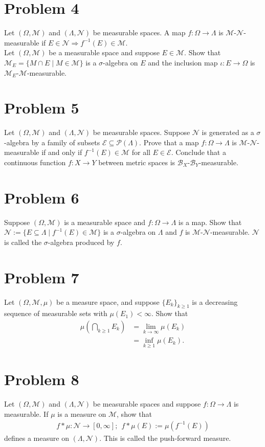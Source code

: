 \documentclass[10pt]{extarticle}
\begin{document}
  \section{Problem 4}%
  Let $(\Omega,\mathcal{M})$ and $(\Lambda,\mathcal{N})$ be measurable spaces. A map $f: \Omega \rightarrow \Lambda$ is $\mathcal{M}$-$\mathcal{N}$-measurable if $E\in\mathcal{N}\Rightarrow f^{-1}(E)\in \mathcal{M}$.\\

  Let $(\Omega,\mathcal{M})$ be a measurable space and suppose $E\in\mathcal{M}$. Show that $\mathcal{M}_{E} = \{M\cap E\mid M\in\mathcal{M}\}$ is a $\sigma$-algebra on $E$ and the inclusion map $\iota: E\rightarrow \Omega$ is $\mathcal{M}_{E}$-$\mathcal{M}$-measurable.
  \section{Problem 5}%
  Let $(\Omega,\mathcal{M})$ and $(\Lambda,\mathcal{N})$ be measurable spaces. Suppose $\mathcal{N}$ is generated as a $\sigma$-algebra by a family of subsets $\mathcal{E}\subseteq \mathcal{P}(\Lambda)$. Prove that a map $f:\Omega \rightarrow \Lambda$ is $\mathcal{M}$-$\mathcal{N}$-measurable if and only if $f^{-1}(E)\in \mathcal{M}$ for all $E\in \mathcal{E}$. Conclude that a continuous function $f: X\rightarrow Y$ between metric spaces is $\mathcal{B}_{X}$-$\mathcal{B}_{Y}$-measurable.
  \section{Problem 6}%
  Suppose $(\Omega,\mathcal{M})$ is a measurable space and $f: \Omega \rightarrow \Lambda$ is a map. Show that $\mathcal{N}:= \{E\subseteq \Lambda\mid f^{-1}(E)\in \mathcal{M}\}$ is a $\sigma$-algebra on $\Lambda$ and $f$ is $\mathcal{M}$-$\mathcal{N}$-measurable. $\mathcal{N}$ is called the $\sigma$-algebra produced by $f$.
  \section{Problem 7}%
  Let $(\Omega,\mathcal{M},\mu)$ be a measure space, and suppose $\{E_k\}_{k\geq 1}$ is a decreasing sequence of measurable sets with $\mu(E_1) < \infty$. Show that
  \begin{align*}
    \mu\left(\bigcap_{k\geq 1}E_k\right) &= \lim_{k\rightarrow\infty}\mu(E_k)\\
                                         &= \inf_{k\geq 1}\mu(E_k).
  \end{align*}
  \section{Problem 8}%
  Let $(\Omega,\mathcal{M})$ and $(\Lambda,\mathcal{N})$ be measurable spaces and suppose $f: \Omega \rightarrow \Lambda$ is measurable. If $\mu$ is a measure on $\mathcal{M}$, show that
  \begin{align*}
    f\ast \mu: \mathcal{N}\rightarrow [0,\infty];~~f\ast \mu(E) := \mu(f^{-1}(E))
  \end{align*}
  defines a measure on $(\Lambda,\mathcal{N})$. This is called the push-forward measure.
\end{document}
